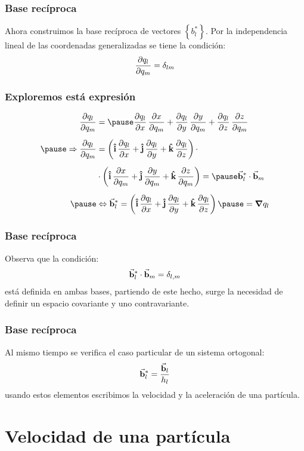 \documentclass[12pt]{beamer}
\begin{document}
\begin{frame}
\frametitle{Base recíproca}
Ahora construimos la base recíproca de vectores $\left\{ b_{l}^{*} \right\}$.
\pause
Por la independencia lineal de las coordenadas generalizadas se tiene la condición:
\pause
\begin{align*}
\pdv{q_{l}}{q_{m}} = \delta_{l m}
\end{align*}
\end{frame}
\begin{frame}
\frametitle{Exploremos está expresión}
\begin{equation}
\begin{aligned}
\pdv{q_{l}}{q_{m}} &= \pause \pdv{q_{l}}{x} \, \pdv{x}{q_{m}} + \pdv{q_{l}}{y} \, \pdv{y}{q_{m}} + \pdv{q_{l}}{z} \, \pdv{z}{q_{m}} \\[0.5em] \pause
\Rightarrow \pdv{q_{l}}{q_{m}} &= \left( \vu{i} \, \pdv{q_{l}}{x} + \vu{j} \, \pdv{q_{l}}{y} + \vu{k} \, \pdv{q_{l}}{z} \right) \cdot \\[0.5em]
&\cdot \left( \vu{i} \, \pdv{x}{q_{m}} + \vu{j} \, \pdv{y}{q_{m}} + \vu{k} \, \pdv{z}{q_{m}} \right) = \pause
\va{b}_{l}^{*} \cdot \va{b}_{m} \\[0.5em] \pause
&\Leftrightarrow \va{b}_{l}^{*} = \left( \vu{i} \, \pdv{q_{l}}{x} + \vu{j} \, \pdv{q_{l}}{y} + \vu{k} \, \pdv{q_{l}}{z} \right) \pause = \grad{q_{l}}
\end{aligned}
\label{eq:ecuacion_01_05}
\end{equation}
\end{frame}
\begin{frame}
\frametitle{Base recíproca}
Observa que la condición:
\pause
\begin{align*}
\va{b}_{l}^{*} \cdot \va{b}_{m} = \delta_{l, m}
\end{align*}
está definida en ambas bases, partiendo de este hecho, surge la necesidad de definir un espacio covariante y uno contravariante.
\end{frame}
\begin{frame}
\frametitle{Base recíproca}
Al mismo tiempo se verifica el caso particular de un sistema ortogonal:
\begin{align*}
\va{b}_{l}^{*} = \dfrac{\va{b}_{l}}{h_{l}} 
\end{align*}
usando estos elementos escribimos la velocidad y la aceleración de una partícula.
\end{frame}

\section{Velocidad de una partícula}
\end{document}
